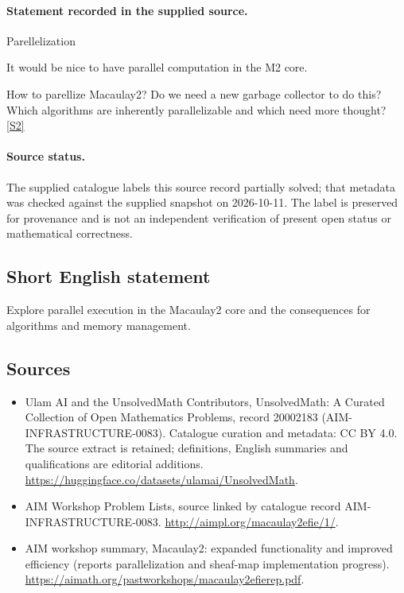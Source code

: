 \documentclass[11pt]{article}
\newcommand{\sref}[2]{\hyperlink{source:#1:#2}{[S#2]}}
\begin{document}
\paragraph{Statement recorded in the supplied source.}
Parellelization

It would be nice to have parallel computation in the M2 core.

How to parellize Macaulay2? Do we need a new garbage collector to do this? Which algorithms are inherently parallelizable and which need more thought? \sref{20002183}{2}
\paragraph{Source status.}
The supplied catalogue labels this source record partially solved; that metadata was checked against the supplied snapshot on 2026-10-11. The label is preserved for provenance and is not an independent verification of present open status or mathematical correctness.
\subsection{Short English statement}
Explore parallel execution in the Macaulay2 core and the consequences for algorithms and memory management.
\subsection{Sources}
\begin{itemize}
\item[\hypertarget{source:20002183:1}{S1}] Ulam AI and the UnsolvedMath Contributors, UnsolvedMath: A Curated Collection of Open Mathematics Problems, record 20002183 (AIM-INFRASTRUCTURE-0083). Catalogue curation and metadata: CC BY 4.0. The source extract is retained; definitions, English summaries and qualifications are editorial additions.
\url{https://huggingface.co/datasets/ulamai/UnsolvedMath}.
\item[\hypertarget{source:20002183:2}{S2}] AIM Workshop Problem Lists, source linked by catalogue record AIM-INFRASTRUCTURE-0083.
\url{http://aimpl.org/macaulay2efie/1/}.
\item[\hypertarget{source:20002183:3}{S3}] AIM workshop summary, Macaulay2: expanded functionality and improved efficiency (reports parallelization and sheaf-map implementation progress).
\url{https://aimath.org/pastworkshops/macaulay2efierep.pdf}.
\end{itemize}
\end{document}
